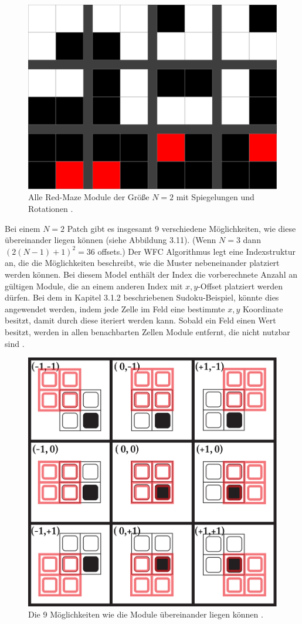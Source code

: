 \documentclass[12pt, a4paper,twoside,openany]{report} %
\begin{document}
\begin{figure}[H]
    \centering
    \includegraphics[width=0.5\linewidth]{images/red-maze-modules.jpg}%
    \caption{Alle Red-Maze Module der Größe $N = 2$ mit Spiegelungen und Rotationen \cite{Karth2017WaveFunctionCollapseIC}.}%
\end{figure}

\newpage

Bei einem $N = 2$ Patch gibt es insgesamt 9 verschiedene Möglichkeiten, wie diese übereinander liegen können {(siehe Abbildung 3.11)}.
{(Wenn $N = 3$ dann $(2(N - 1) + 1)^2 = 36$ offsets.)}
Der WFC Algorithmus legt eine Indexstruktur an, die die Möglichkeiten beschreibt, wie die Muster nebeneinander platziert werden können.
Bei diesem Model enthält der Index die vorberechnete Anzahl an gültigen Module, die an einem anderen Index mit $x,y$-Offset platziert werden dürfen. 
Bei dem in Kapitel 3.1.2 beschriebenen Sudoku-Beispiel, könnte dies angewendet werden,
indem jede Zelle im Feld eine bestimmte $x,y$ Koordinate besitzt, damit durch diese iteriert werden kann.
Sobald ein Feld einen Wert besitzt, werden in allen benachbarten Zellen Module entfernt, die nicht nutzbar sind \cite{Karth2017WaveFunctionCollapseIC}.

\begin{figure}[H]
    \centering
    \includegraphics[width=0.5\linewidth]{images/red-maze-offset.png}%
    \caption{Die 9 Möglichkeiten wie die Module übereinander liegen können \cite{Karth2017WaveFunctionCollapseIC}.}%
\end{figure}
\end{document}
